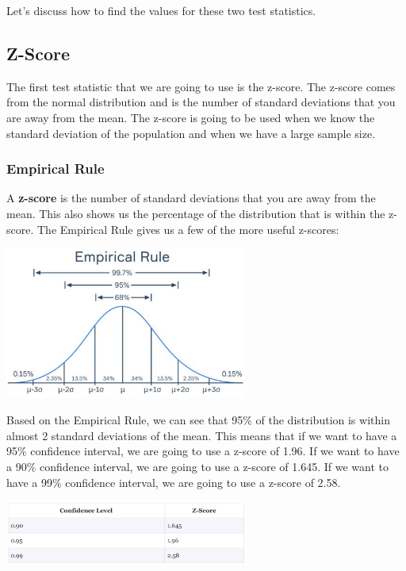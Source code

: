 \documentclass[
  letterpaper,
  DIV=11,
  numbers=noendperiod]{scrreprt}
\begin{document}
Let's discuss how to find the values for these two test statistics.

\subsection*{Z-Score}\label{z-score}

The first test statistic that we are going to use is the z-score. The
z-score comes from the normal distribution and is the number of standard
deviations that you are away from the mean. The z-score is going to be
used when we know the standard deviation of the population and when we
have a large sample size.

\subsubsection*{Empirical Rule}\label{empirical-rule}

A \textbf{z-score} is the number of standard deviations that you are
away from the mean. This also shows us the percentage of the
distribution that is within the z-score. The Empirical Rule gives us a
few of the more useful z-scores:

\includegraphics[width=0.6\textwidth,height=\textheight]{./images/EPCI_1.jpg}

Based on the Empirical Rule, we can see that 95\% of the distribution is
within almost 2 standard deviations of the mean. This means that if we
want to have a 95\% confidence interval, we are going to use a z-score
of 1.96. If we want to have a 90\% confidence interval, we are going to
use a z-score of 1.645. If we want to have a 99\% confidence interval,
we are going to use a z-score of 2.58.

\includegraphics[width=0.6\textwidth,height=\textheight]{./images/EPCI_2.jpg}
\end{document}
